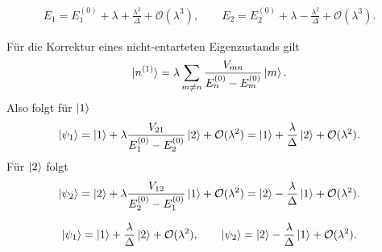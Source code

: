 \documentclass[11pt,a4paper]{scrartcl}
\newcommand{\abs}[1]{\left| #1 \right|}
\begin{document}
\begin{enumerate}[label=(\alph*)]
\begin{calculationbox}
\begin{calculationbox}[title=Energien bis zweiter Ordnung]
                \begin{solutionbox}[title=Energieeigenwerte für $\lambda\ll\abs\Delta$]
                    \begin{align*}
                        E_1
                        =
                        E_1^{(0)}+\lambda+\frac{\lambda^2}{\Delta}
                        +\mathcal O(\lambda^3),
                        \qquad
                        E_2
                        =
                        E_2^{(0)}+\lambda-\frac{\lambda^2}{\Delta}
                        +\mathcal O(\lambda^3).
                    \end{align*}
                \end{solutionbox}
            \end{calculationbox}

            \begin{calculationbox}[title=Eigenzustände bis erster Ordnung]
                Für die Korrektur eines nicht-entarteten Eigenzustands gilt
                \begin{align*}
                    \ket{n^{(1)}}
                    =
                    \lambda
                    \sum_{m\neq n}
                    \frac{V_{mn}}{E_n^{(0)}-E_m^{(0)}}\ket m.
                \end{align*}
                Also folgt für $\ket1$
                \begin{align*}
                    \ket{\psi_1}
                    =
                    \ket1+\lambda\frac{V_{21}}{E_1^{(0)}-E_2^{(0)}}\ket2
                    +\mathcal O(\lambda^2)
                    =
                    \ket1+\frac{\lambda}{\Delta}\ket2+\mathcal O(\lambda^2).
                \end{align*}
                Für $\ket2$ folgt
                \begin{align*}
                    \ket{\psi_2}
                    =
                    \ket2+\lambda\frac{V_{12}}{E_2^{(0)}-E_1^{(0)}}\ket1
                    +\mathcal O(\lambda^2)
                    =
                    \ket2-\frac{\lambda}{\Delta}\ket1+\mathcal O(\lambda^2).
                \end{align*}

                \begin{solutionbox}[title=Eigenzustände bis erster Ordnung]
                    \begin{align*}
                        \ket{\psi_1}
                        =
                        \ket1+\frac{\lambda}{\Delta}\ket2+\mathcal O(\lambda^2),
                        \qquad
                        \ket{\psi_2}
                        =
                        \ket2-\frac{\lambda}{\Delta}\ket1+\mathcal O(\lambda^2).
                    \end{align*}
                \end{solutionbox}
            \end{calculationbox}


\end{calculationbox}
\end{enumerate}
\end{document}
